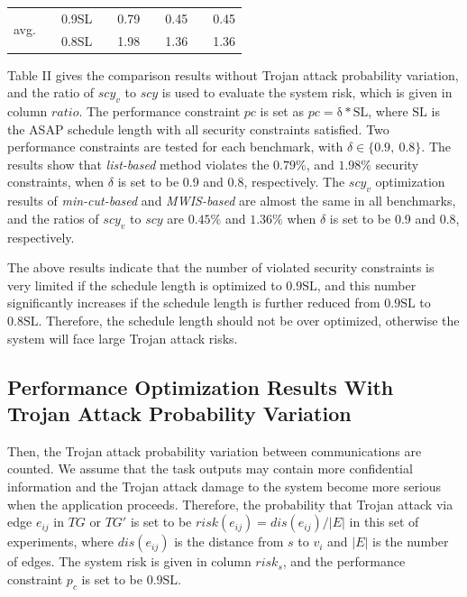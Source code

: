 \documentclass[10pt,journal]{IEEEtran}
\begin{document}
\begin{table}[!h]
\begin{tabular}{c|c|c|c|c|c|c|c|c}
\hline
\multicolumn{1}{c|}{\multirow{2}{*}{\hspace*{-1em}avg.\hspace*{-1em}}}           &\multicolumn{1}{c|}{\multirow{2}{*}{}}    &\hspace*{-1em}0.9SL\hspace*{-1em}  &   &0.79   &  &0.45   &   &0.45    \\
   &     &\hspace*{-1em}0.8SL\hspace*{-1em}   &    &1.98    &   &1.36   &   &1.36  \\
\hline
\hline
\end{tabular}
\label{table:VPCTC}
\end{table}



Table II gives the comparison results without Trojan attack probability variation, and the ratio of $scy_v$ to $scy$ is used to evaluate the system risk, which is given in column $ratio$. The performance constraint $pc$ is set as $pc=\mathrm{\delta*SL}$, where $\mathrm{SL}$ is the ASAP schedule length with all security constraints satisfied. Two performance constraints are tested for each benchmark, with $\delta \in \{0.9, ~0.8\}$. The results show that \textit{list-based} method violates the $0.79\%$, and $1.98\%$ security constraints, when $\delta$ is set to be 0.9 and 0.8, respectively. The $scy_v$ optimization results of \textit{min-cut-based} and \textit{MWIS-based} are almost the same in all benchmarks, and the ratios of $scy_v$ to $scy$ are $0.45\%$ and $1.36\%$ when $\delta$ is set to be 0.9 and 0.8, respectively.

The above results indicate that the number of violated security constraints is very limited if the schedule length is optimized to $0.9\mathrm{SL}$, and this number significantly increases if the schedule length is further reduced from $0.9\mathrm{SL}$ to $0.8\mathrm{SL}$. Therefore, the schedule length should not be over optimized, otherwise the system will face large Trojan attack risks.

\subsection{Performance Optimization Results With Trojan Attack Probability Variation}

Then, the Trojan attack probability variation between communications are counted. We assume that the task outputs may contain more confidential information and the Trojan attack damage to the system become more serious when the application proceeds. Therefore, the probability that Trojan attack via edge $e_{ij}$ in $TG$ or $TG'$ is set to be $risk(e_{ij})=dis(e_{ij})/|E|$ in this set of experiments, where $dis(e_{ij})$ is the distance from $s$ to $v_i$ and $|E|$ is the number of edges. The system risk is given in column $risk_s$, and the performance constraint $p_c$ is set to be $0.9\mathrm{SL}$.
\end{document}
